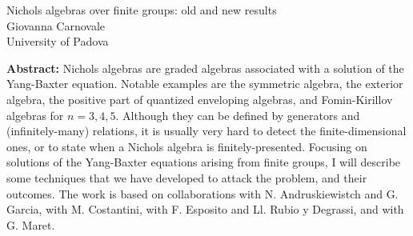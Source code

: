 \documentclass[12pt,a4paper]{article}
\begin{document}
\thispagestyle{empty} 
\begin{center}
{\large  Nichols algebras over finite groups: old and new results}\\
\vspace*{.5cm}
Giovanna Carnovale\\
University of Padova\\
\end{center}
\vspace*{.8cm}

{\bf Abstract:} Nichols algebras are graded algebras associated with a solution of the Yang-Baxter equation. Notable examples are the symmetric algebra, the exterior algebra, the positive part of quantized enveloping algebras, and Fomin-Kirillov algebras for $n=3,4,5$. Although they can be defined by generators and (infinitely-many) relations, it is usually very hard to detect the finite-dimensional ones, or to state when a Nichols algebra is finitely-presented. Focusing on solutions of the Yang-Baxter equations arising from finite groups, I will describe some techniques that we have developed to attack the problem, and their outcomes.
The work is based on collaborations with N. Andruskiewistch and G. Garcia, with M. Costantini, with F. Esposito and Ll. Rubio y Degrassi, and with G. Maret.
\end{document}
